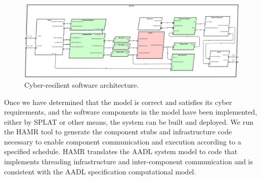 \begin{figure}[h]
	\centering
	\includegraphics[width=1\columnwidth]{figs/hardened-sw.png}
	\caption{Cyber-resilient software architecture.} 
	\label{fig:hardened-sw} 
\end{figure}

Once we have determined that the model is correct and satisfies its cyber requirements, and the software components in the model have been implemented, either by SPLAT or other means, the system can be built and deployed.  We run the HAMR tool to generate the component stubs and infrastructure code necessary to enable component communication and execution according to a specified schedule.
HAMR translates the AADL system model to code that implements threading infrastructure and inter-component communication and is consistent with the AADL specification computational model. 

